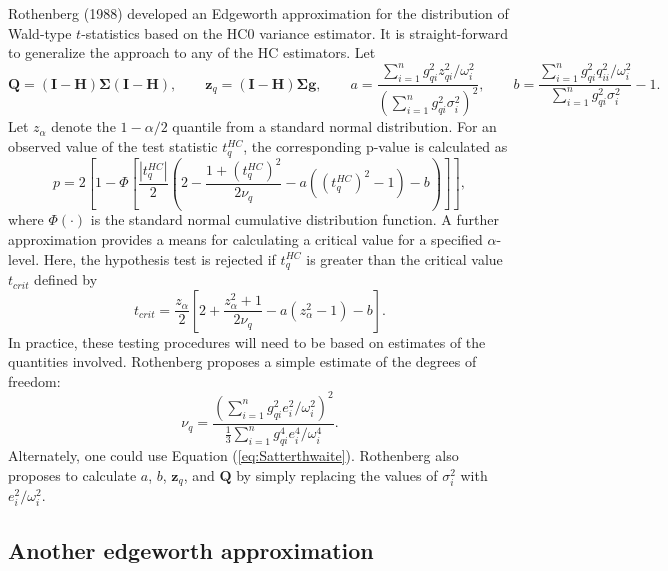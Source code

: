 \documentclass{article}\usepackage[]{graphicx}\usepackage[]{color}
\newcommand{\bm}{\mathbf}
\newcommand{\bs}{\boldsymbol}
\begin{document}
Rothenberg (1988) developed an Edgeworth approximation for the distribution of Wald-type $t$-statistics based on the HC0 variance estimator. It is straight-forward to generalize the approach to any of the HC estimators. Let \[
\bm{Q} = \left(\bm{I} - \bm{H}\right)\bs\Sigma\left(\bm{I} - \bm{H}\right), \qquad \bm{z}_q = \left(\bm{I} - \bm{H}\right)\bs\Sigma \bm{g}, \qquad a = \frac{\sum_{i=1}^n g_{qi}^2 z_{qi}^2 / \omega_i^2 }{\left(\sum_{i=1}^n g_{qi}^2 \sigma_i^2\right)^2}, \qquad b = \frac{\sum_{i=1}^n g_{qi}^2  q_{ii}^2 / \omega_i^2}{\sum_{i=1}^n g_{qi}^2 \sigma_i^2} - 1. \]
Let $z_{\alpha}$ denote the $1 - \alpha / 2$ quantile from a standard normal distribution. For an observed value of the test statistic $t^{HC}_q$, the corresponding p-value is calculated as \[
p = 2 \left[1 - \Phi\left[\frac{\left|t^{HC}_q\right|}{2}\left(2 - \frac{1 + \left(t^{HC}_q\right)^2}{2 \nu_q} - a\left(\left(t^{HC}_q\right)^2 - 1\right) - b\right)\right]\right], \]
where $\Phi(\cdot)$ is the standard normal cumulative distribution function. A further approximation provides a means for calculating a critical value for a specified $\alpha$-level. Here, the hypothesis test is rejected if $t^{HC}_q$ is greater than the critical value $t_{crit}$ defined by \[
t_{crit} = \frac{z_{\alpha}}{2}\left[2 + \frac{z_{\alpha}^2 + 1}{2 \nu_q} - a\left(z_{\alpha}^2 - 1\right) - b\right]. \]
In practice, these testing procedures will need to be based on estimates of the quantities involved. Rothenberg proposes a simple estimate of the degrees of freedom: \[
\nu_q = \frac{\left(\sum_{i=1}^n g_{qi}^2 e_i^2 / \omega_i^2\right)^2}{\frac{1}{3}\sum_{i=1}^n g_{qi}^4 e_i^4 / \omega_i^4}.
\]
Alternately, one could use Equation (\ref{eq:Satterthwaite}). Rothenberg also proposes to calculate $a$, $b$, $\bm{z}_q$, and $\bm{Q}$ by simply replacing the values of $\sigma_i^2$ with $e_i^2 / \omega_i^2$.

\subsection{Another edgeworth approximation}
\end{document}
